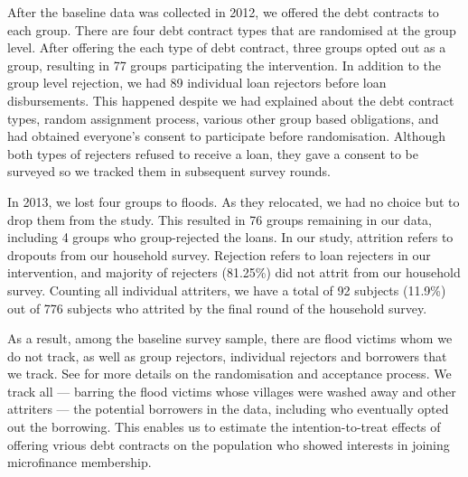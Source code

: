 	After the baseline data was collected in 2012, we offered the debt contracts to each group. There are four debt contract types that are randomised at the group level. After offering the each type of debt contract, three groups opted out as a group, resulting in 77 groups participating the intervention. In addition to the group level rejection, we had 89 individual loan rejectors before loan disbursements. This happened despite we had explained about the debt contract types, random assignment process, various other group based obligations, and had obtained everyone's consent to participate before randomisation. Although both types of rejecters refused to receive a loan, they gave a consent to be surveyed so we tracked them in subsequent survey rounds.



	In 2013, we lost four groups to floods. As they relocated, we had no choice but to drop them from the study. This resulted in 76 groups remaining in our data, including 4 groups who group-rejected the loans. In our study, attrition refers to dropouts from our household survey. Rejection refers to loan rejecters in our intervention, and majority of rejecters (81.25\%) did not attrit from our household survey. Counting all individual attriters, we have a total of 92 subjects (11.9\%) out of 776 subjects who attrited by the final round of the household survey. 

	As a result, among the baseline survey sample, there are flood victims whom we do not track, as well as group rejectors, individual rejectors and borrowers that we track. See \citet{GUK2016} for more details on the randomisation and acceptance process. We track all --- barring the flood victims whose villages were washed away and other attriters --- the potential borrowers in the data, including who eventually opted out the borrowing. This enables us to estimate the intention-to-treat effects of offering vrious debt contracts on the population who showed interests in joining microfinance membership. 

